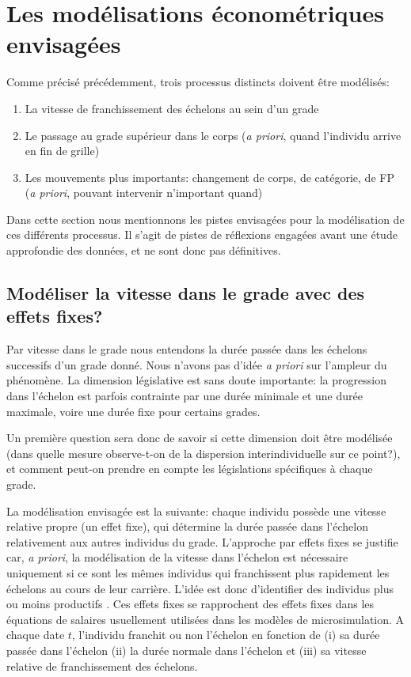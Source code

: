 \documentclass[11pt,a4paper]{article}
\begin{document}
\else \fi



\section{Les modélisations économétriques envisagées}

Comme précisé précédemment, trois processus distincts doivent être modélisés: 
\begin{enumerate}[leftmargin=1cm ,parsep=0cm,itemsep=0cm,topsep=0cm]
\item La vitesse de franchissement des échelons au sein d'un grade
\item Le passage au grade supérieur dans le corps (\textit{a priori}, quand l'individu arrive en fin de grille)
\item Les mouvements plus importants: changement de corps, de catégorie, de FP (\textit{a priori}, pouvant intervenir n'important quand)
\end{enumerate}

Dans cette section nous mentionnons les pistes envisagées pour la modélisation de ces différents processus. Il s'agit de pistes de réflexions engagées avant une étude approfondie des données, et ne sont donc pas définitives. 


\subsection{Modéliser la vitesse dans le grade avec des effets fixes?}

Par vitesse dans le grade nous entendons la durée passée dans les échelons successifs d'un grade donné. Nous n'avons pas d'idée \textit{a priori} sur l'ampleur du phénomène. La dimension législative est sans doute importante: la progression dans l'échelon est parfois contrainte par une durée minimale et une durée maximale, voire une durée fixe pour certains grades. 

Un première question sera donc de savoir si cette dimension doit être modélisée (dans quelle mesure observe-t-on de la dispersion interindividuelle sur ce point?), et comment peut-on prendre en compte les législations spécifiques à chaque grade. 

La modélisation envisagée est la suivante: chaque individu possède une vitesse relative propre (un effet fixe), qui détermine la durée passée dans l'échelon relativement aux autres individus du grade. L'approche par effets fixes se justifie car, \textit{a priori}, la modélisation de la vitesse dans l'échelon est nécessaire uniquement si ce sont les mêmes individus qui franchissent plus rapidement les échelons au cours de leur carrière. L'idée est donc d'identifier des individus plus ou moins \og productifs \fg{}. Ces effets fixes se rapprochent des effets fixes dans les équations de salaires usuellement utilisées dans les modèles de microsimulation.  
A chaque date $t$, l'individu franchit ou non l'échelon en fonction de (i) sa durée passée dans l'échelon (ii) la durée \og normale \fg{} dans l'échelon et (iii) sa vitesse relative de franchissement des échelons. 
\end{document}
